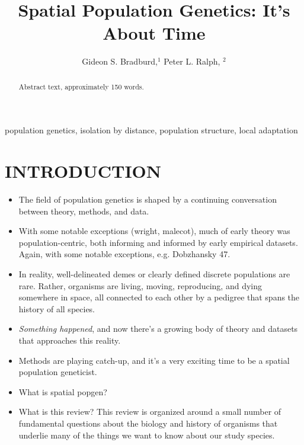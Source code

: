\documentclass{ar-1col}
\begin{document}

\title{Spatial Population Genetics: It's About Time}


\author{Gideon S. Bradburd,$^1$ Peter L. Ralph, $^2$
}

\begin{abstract}
Abstract text, approximately 150 words. 
\end{abstract}

\begin{keywords}
population genetics, isolation by distance, population structure, local adaptation
\end{keywords}
\maketitle

\tableofcontents


\section{INTRODUCTION}

\begin{itemize}
\item The field of population genetics is shaped by a continuing conversation 
between theory, methods, and data.
\item With some notable exceptions (wright, malecot), 
much of early theory was population-centric, 
both informing and informed by early empirical datasets.
	\subitem Again, with some notable exceptions, e.g. Dobzhansky 47.
\item In reality, well-delineated demes or clearly defined discrete populations are rare.
Rather, organisms are living, moving, reproducing, and dying somewhere in space, 
all connected to each other by a pedigree that spans the history of all species.
\item \emph{Something happened}, 
and now there's a growing body of theory and datasets 
that approaches this reality.
\item Methods are playing catch-up, 
and it's a very exciting time to be a spatial population geneticist.
\item What is spatial popgen?
\item What is this review?
\subitem This review is organized around a small number of 
fundamental questions about the biology and history of organisms 
that underlie many of the things we want to know about our study species.
\end{itemize}
\end{document}
